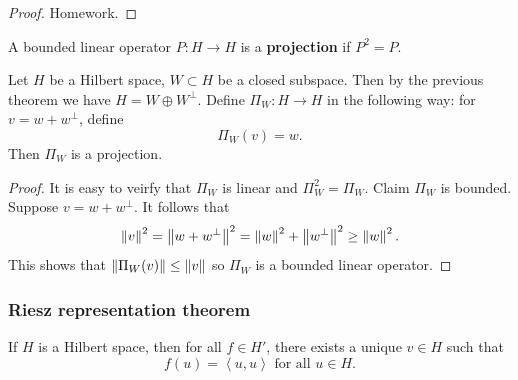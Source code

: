\documentclass[a4paper]{article}
\renewcommand{\braket}[2]{\left\langle #1, #1 \right\rangle}
\begin{document}
\begin{proof}
  Homework.
\end{proof}

\begin{defi}[Projection]
  A bounded linear operator $P : H \to H$ is a \textbf{projection}
  if $P^2 = P$.
\end{defi}

\begin{thm}
  Let $H$ be a Hilbert space, $W \subset H$ be a closed
  subspace. Then by the previous theorem we have $H = W
    \oplus W^\perp$. Define $\Pi_W : H \to H$ in the following
  way: for $v = w + w^\perp$, define
  \[
    \Pi_W (v) = w.
  \]
  Then $\Pi_W$ is a projection.
\end{thm}

\begin{proof}
  It is easy to veirfy that $\Pi_W$ is linear
  and $\Pi_W^2 = \Pi_W$.
  Claim $\Pi_W$ is bounded. Suppose $v = w + w^\perp$.
  It follows that
  \[
    \left\lVert v\right\rVert^2 = \left\lVert w + w^\perp\right\rVert^2
    = \left\lVert w\right\rVert^2 + \left\lVert w^\perp\right\rVert^2 \geq \left\lVert w\right\rVert^2.
  \]
  This shows that $\left\lVert \Pi_W(v)\right\rVert \leq \left\lVert v\right\rVert$
  so $\Pi_W$ is a bounded linear operator.
\end{proof}

\subsubsection*{Riesz representation theorem}

\begin{thm}
  If $H$ is a Hilbert space, then for all $f \in H'$,
  there exists a unique $v \in H$ such that
  \[
    f(u) = \braket{u}{v} \text{ for all $u \in H$}.
  \]
\end{thm}
\end{document}
